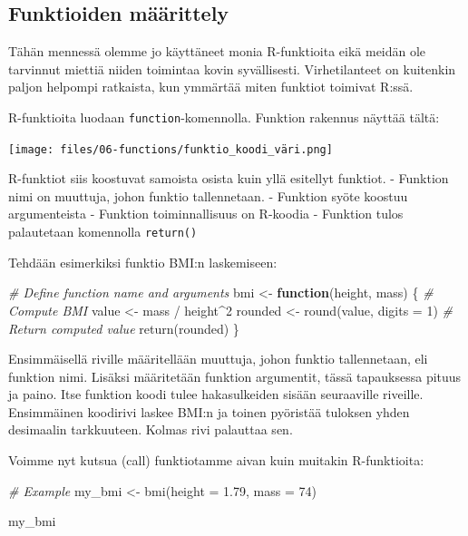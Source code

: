 \documentclass[
]{book}
\newenvironment{Shaded}{\begin{snugshade}}{\end{snugshade}}
\newcommand{\AttributeTok}[1]{\textcolor[rgb]{0.77,0.63,0.00}{#1}}
\newcommand{\CommentTok}[1]{\textcolor[rgb]{0.56,0.35,0.01}{\textit{#1}}}
\newcommand{\ControlFlowTok}[1]{\textcolor[rgb]{0.13,0.29,0.53}{\textbf{#1}}}
\newcommand{\DecValTok}[1]{\textcolor[rgb]{0.00,0.00,0.81}{#1}}
\newcommand{\FloatTok}[1]{\textcolor[rgb]{0.00,0.00,0.81}{#1}}
\newcommand{\FunctionTok}[1]{\textcolor[rgb]{0.00,0.00,0.00}{#1}}
\newcommand{\NormalTok}[1]{#1}
\newcommand{\OtherTok}[1]{\textcolor[rgb]{0.56,0.35,0.01}{#1}}
\newcommand{\SpecialCharTok}[1]{\textcolor[rgb]{0.00,0.00,0.00}{#1}}
\begin{document}
\hypertarget{funktioiden-muxe4uxe4rittely}{%
\subsection{Funktioiden määrittely}\label{funktioiden-muxe4uxe4rittely}}

Tähän mennessä olemme jo käyttäneet monia R-funktioita eikä meidän ole tarvinnut miettiä niiden toimintaa kovin syvällisesti. Virhetilanteet on kuitenkin paljon helpompi ratkaista, kun ymmärtää miten funktiot toimivat R:ssä.

R-funktioita luodaan \texttt{function}-komennolla. Funktion rakennus näyttää tältä:

\texttt{[image: files/06-functions/funktio\_koodi\_väri.png]}

R-funktiot siis koostuvat samoista osista kuin yllä esitellyt funktiot.
- Funktion nimi on muuttuja, johon funktio tallennetaan.
- Funktion syöte koostuu argumenteista
- Funktion toiminnallisuus on R-koodia
- Funktion tulos palautetaan komennolla \texttt{return()}

Tehdään esimerkiksi funktio BMI:n laskemiseen:

\begin{Shaded}
\begin{Highlighting}[]
\CommentTok{\# Define function name and arguments}
\NormalTok{bmi }\OtherTok{\textless{}{-}} \ControlFlowTok{function}\NormalTok{(height, mass) \{}
  \CommentTok{\# Compute BMI}
\NormalTok{  value }\OtherTok{\textless{}{-}}\NormalTok{ mass }\SpecialCharTok{/}\NormalTok{ height}\SpecialCharTok{\^{}}\DecValTok{2}
\NormalTok{  rounded }\OtherTok{\textless{}{-}} \FunctionTok{round}\NormalTok{(value, }\AttributeTok{digits =} \DecValTok{1}\NormalTok{)}
  \CommentTok{\# Return computed value}
  \FunctionTok{return}\NormalTok{(rounded)}
\NormalTok{\}}
\end{Highlighting}
\end{Shaded}

Ensimmäisellä riville määritellään muuttuja, johon funktio tallennetaan, eli funktion nimi. Lisäksi määritetään funktion argumentit, tässä tapauksessa pituus ja paino. Itse funktion koodi tulee hakasulkeiden sisään seuraaville riveille. Ensimmäinen koodirivi laskee BMI:n ja toinen pyöristää tuloksen yhden desimaalin tarkkuuteen. Kolmas rivi palauttaa sen.

Voimme nyt kutsua (call) funktiotamme aivan kuin muitakin R-funktioita:

\begin{Shaded}
\begin{Highlighting}[]
\CommentTok{\# Example}
\NormalTok{my\_bmi }\OtherTok{\textless{}{-}} \FunctionTok{bmi}\NormalTok{(}\AttributeTok{height =} \FloatTok{1.79}\NormalTok{, }\AttributeTok{mass =} \DecValTok{74}\NormalTok{)}

\NormalTok{my\_bmi}
\end{Highlighting}
\end{Shaded}
\end{document}
